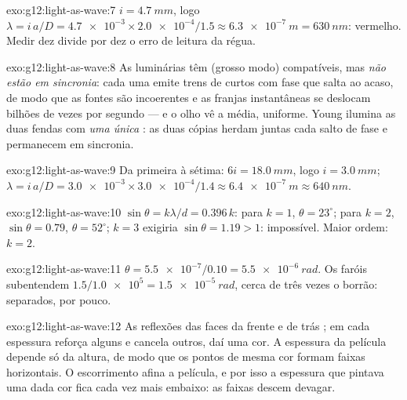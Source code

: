 \begin{solution}{exo:g12:light-as-wave:7}
$i = \qty{4.7}{mm}$, logo
$\lambda = i\,a/D = \num{4.7e-3} \times \num{2.0e-4}/1.5 \approx
\qty{6.3e-7}{m} = \qty{630}{nm}$: vermelho. Medir dez 
divide por dez o erro de leitura da régua.
\end{solution}

\begin{solution}{exo:g12:light-as-wave:8}
As luminárias têm  (grosso modo) compatíveis, mas \emph{não
estão em sincronia}: cada uma emite trens de  curtos com fase que
salta ao acaso, de modo que as fontes são incoerentes e as franjas
instantâneas se deslocam bilhões de vezes por segundo --- e o olho vê a
média, uniforme. Young ilumina as duas fendas com \emph{uma única} :
as duas cópias herdam juntas cada salto de fase e permanecem em
sincronia.
\end{solution}

\begin{solution}{exo:g12:light-as-wave:9}
Da primeira à sétima: $6i = \qty{18.0}{mm}$, logo $i = \qty{3.0}{mm}$;
$\lambda = i\,a/D = \num{3.0e-3} \times \num{3.0e-4}/1.4 \approx
\qty{6.4e-7}{m} \approx \qty{640}{nm}$.
\end{solution}

\begin{solution}{exo:g12:light-as-wave:10}
$\sin\theta = k\lambda/d = 0.396\,k$: para $k = 1$,
$\theta = 23^\circ$; para $k = 2$, $\sin\theta = 0.79$,
$\theta = 52^\circ$; $k = 3$ exigiria $\sin\theta = 1.19 > 1$:
impossível. Maior ordem: $k = 2$.
\end{solution}

\begin{solution}{exo:g12:light-as-wave:11}
$\theta = \num{5.5e-7}/0.10 = \qty{5.5e-6}{rad}$. Os faróis subentendem
$1.5/\num{1.0e5} = \qty{1.5e-5}{rad}$, cerca de três vezes o borrão:
separados, por pouco.
\end{solution}

\begin{solution}{exo:g12:light-as-wave:12}
As reflexões das faces da frente e de trás ; em  cada
espessura reforça alguns  e cancela outros, daí uma
cor. A espessura da película depende só da altura, de modo que os pontos
de mesma cor formam faixas horizontais. O escorrimento afina a película,
e por isso a espessura que pintava uma dada cor fica cada vez mais
embaixo: as faixas descem devagar.
\end{solution}

